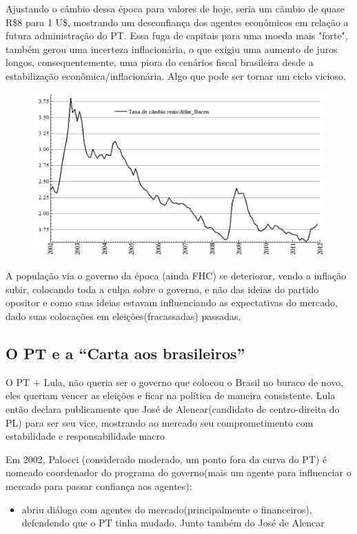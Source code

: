 \documentclass[a4paper,12pt]{article}[abntex2]
\begin{document}
Ajustando o câmbio dessa época para valores de hoje, seria um câmbio de quase R\$8 para 1 U\$, mostrando um desconfiança dos agentes econômicos em relação a futura administração do PT. Essa fuga de capitais para uma moeda mais "forte", também gerou uma incerteza inflacionária, o que exigiu uma aumento de juros longos, consequentemente, uma piora do cenários fiscal brasileira desde a estabilização econômica/inflacionária. Algo que pode ser tornar um ciclo vicioso.

\begin{figure}[H]
    \centering
    \includegraphics[width=0.7\linewidth]{Imagens/a16i2.png}
\end{figure}

A população via o governo da época (ainda FHC) se deteriorar, vendo a inflação subir, colocando toda a culpa sobre o governo, e não das ideias do partido opositor e como suas ideias estavam influenciando as expectativas do mercado, dado suas colocações em eleições(fracassadas) passadas.

\subsection{\textbf{O PT e a “Carta aos brasileiros”}}
O PT + Lula, não queria ser o governo que colocou o Brasil no buraco de novo, eles queriam vencer as eleições e ficar na política de maneira consistente. Lula então declara publicamente que José de Alencar(candidato de centro-direita do PL) para ser seu vice, mostrando ao mercado seu comprometimento com estabilidade e responsabilidade macro

Em 2002, Palocci (considerado moderado, um ponto fora da curva do PT) é nomeado coordenador do programa do governo(mais um agente para influenciar o mercado para passar confiança aos agentes):\begin{itemize}
    \item abriu diálogo com agentes do mercado(principalmente o financeiros), defendendo que o PT tinha mudado. Junto também do José de Alencar
\end{itemize}
\end{document}
